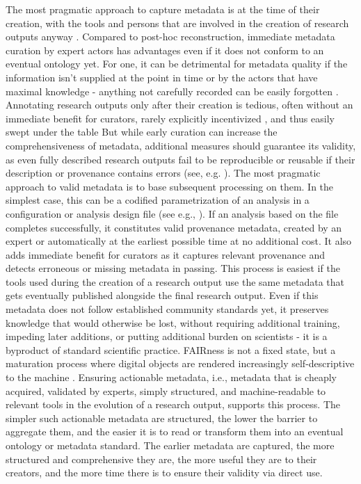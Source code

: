 The most pragmatic approach to capture metadata is at the time of their creation, with the tools and persons that are involved in the creation of research outputs anyway \citep{dallas2016digital}.
Compared to post-hoc reconstruction, immediate metadata curation by expert actors has advantages even if it does not conform to an eventual ontology yet. For one, it can be detrimental for metadata quality if the information isn’t supplied at the point in time or by the actors that have maximal knowledge - anything not carefully recorded can be easily forgotten \citep{gryk2019foregrounding}.
Annotating research outputs only after their creation is tedious, often without an immediate benefit for curators, rarely explicitly incentivized \citep{edwards2011science} \citep{san2009long}, and thus easily swept under the table
But while early curation can increase the comprehensiveness of metadata, additional measures should guarantee its validity, as even fully described research outputs fail to be reproducible or reusable if their description or provenance contains errors (see, e.g. \citep{manninen2017reproducibility}).
The most pragmatic approach to valid metadata is to base subsequent processing on them.
In the simplest case, this can be a codified parametrization of an analysis in a configuration or analysis design file (see e.g., \citep{jas2018reproducible}).
If an analysis based on the file completes successfully, it constitutes valid provenance metadata, created by an expert or automatically at the earliest possible time at no additional cost.
It also adds immediate benefit for curators as it captures relevant provenance and detects erroneous or missing metadata in passing.
This process is easiest if the tools used during the creation of a research output use the same metadata that gets eventually published alongside the final research output.
Even if this metadata does not follow established community standards yet, it preserves knowledge that would otherwise be lost, without requiring additional training, impeding later additions, or putting additional burden on scientists - it is a byproduct of standard scientific practice.
FAIRness is not a fixed state, but a maturation process where digital objects are rendered increasingly self-descriptive to the machine \citep{wilkinson2019evaluating}.
Ensuring actionable metadata, i.e., metadata that is cheaply acquired, validated by experts, simply structured, and machine-readable to relevant tools in the evolution of a research output, supports this process.
The simpler such actionable metadata are structured, the lower the barrier to aggregate them, and the easier it is to read or transform them into an eventual ontology or metadata standard.
The earlier metadata are captured, the more structured and comprehensive they are, the more useful they are to their creators, and the more time there is to ensure their validity via direct use.


